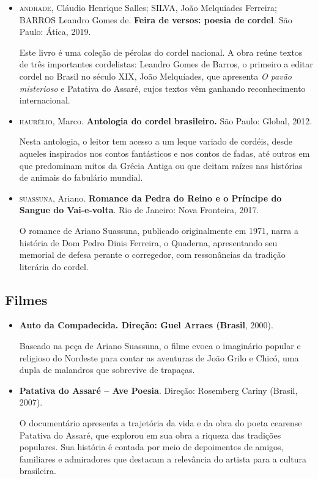 \documentclass[12pt]{extarticle}
\begin{document}
\begin{itemize}
\item \textsc{andrade}, Cláudio Henrique Salles; SILVA, João Melquíades Ferreira;
BARROS Leandro Gomes de. \textbf{Feira de versos: poesia de cordel}.
São Paulo: Ática, 2019.

Este livro é uma coleção de pérolas do cordel nacional. A obra reúne
textos de três importantes cordelistas: Leandro Gomes de Barros, o
primeiro a editar cordel no Brasil no século XIX, João Melquíades, que
apresenta \emph{O pavão misterioso} e Patativa do Assaré, cujos textos
vêm ganhando reconhecimento internacional.


\item \textsc{haurélio}, Marco. \textbf{Antologia do cordel brasileiro.} São Paulo:
Global, 2012.

Nesta antologia, o leitor tem acesso a um leque variado de cordéis,
desde aqueles inspirados nos contos fantásticos e nos contos de fadas,
até outros em que predominam mitos da Grécia Antiga ou que deitam raízes
nas histórias de animais do fabulário mundial.


\item \textsc{suassuna}, Ariano. \textbf{Romance da Pedra do Reino e o Príncipe do
Sangue do Vai-e-volta}. Rio de Janeiro: Nova Fronteira, 2017.

O romance de Ariano Suassuna, publicado originalmente em 1971, narra a
história de Dom Pedro Dinis Ferreira, o Quaderna, apresentando seu
memorial de defesa perante o corregedor, com ressonâncias da tradição
literária do cordel.
\end{itemize}

\subsection{Filmes}

\begin{itemize}
\item \textbf{Auto da Compadecida. Direção: Guel Arraes (Brasil}, 2000).

Baseado na peça de Ariano Suassuna, o filme evoca o imaginário popular e
religioso do Nordeste para contar as aventuras de João Grilo e Chicó,
uma dupla de malandros que sobrevive de trapaças.


\item \textbf{Patativa do Assaré -- Ave Poesia}. Direção: Rosemberg Cariny
(Brasil, 2007).

O documentário apresenta a trajetória da vida e da obra do poeta
cearense Patativa do Assaré, que explorou em sua obra a riqueza das
tradições populares. Sua história é contada por meio de depoimentos de
amigos, familiares e admiradores que destacam a relevância do artista
para a cultura brasileira.
\end{itemize}
\end{document}
